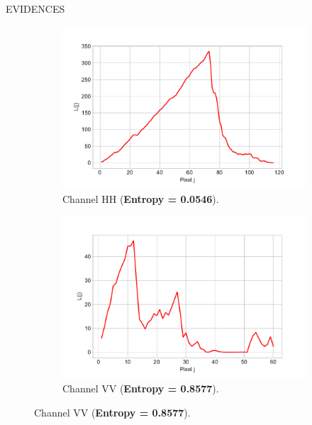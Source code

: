 \documentclass[final]{beamer}
\newlength{\onecolwid}
\newlength{\threecolwid}
\begin{document}
\begin{frame}[t]
\begin{columns}[t,totalwidth=\threecolwid]
\begin{column}{\onecolwid}
\begin{block}{\LARGE{EVIDENCES}}
	\begin{figure}[H]
	\captionsetup[subfigure]{labelformat=empty}
\captionsetup[subfigure]{justification=centering}
   \centering
    \begin{subfigure}{0.48\linewidth}
    \includegraphics[width=17cm]{figures/likelihood_hh.pdf}
    \caption{\small{Channel HH (\textbf{Entropy = 0.0546}).}}
  \end{subfigure}
   \begin{subfigure}{0.48\linewidth}
    \includegraphics[width=17cm]{figures/likelihood_vv.pdf}
   \caption{\small{Channel VV (\textbf{Entropy = 0.8577}).}}
  \end{subfigure}
 \end{figure}
	


\end{block}
\end{column}
\end{columns}
\end{frame}
\end{document}
